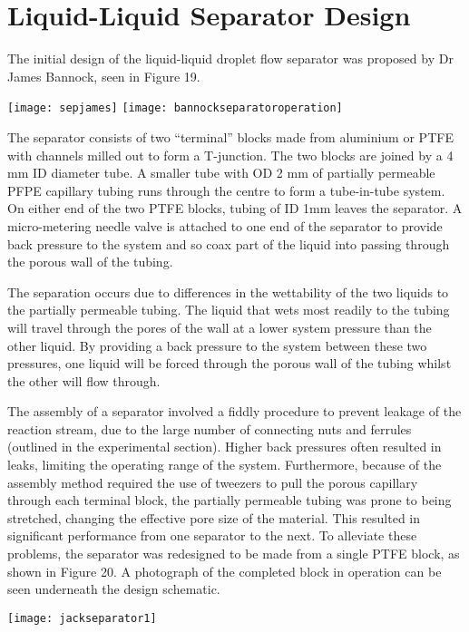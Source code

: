 \section{Liquid-Liquid Separator Design}

The initial design of the liquid-liquid droplet flow separator was proposed by Dr James Bannock, seen in Figure 19. 

\texttt{[image: sepjames]}
\texttt{[image: bannockseparatoroperation]}

The separator consists of two “terminal” blocks made from aluminium or PTFE with channels milled out to form a T-junction. The two blocks are joined by a 4 mm ID diameter tube. A smaller tube with OD 2 mm of partially permeable PFPE capillary tubing runs through the centre to form a tube-in-tube system. On either end of the two PTFE blocks, tubing of ID 1mm leaves the separator. A micro-metering needle valve is attached to one end of the separator to provide back pressure to the system and so coax part of the liquid into passing through the porous wall of the tubing.

The separation occurs due to differences in the wettability of the two liquids to the partially permeable tubing. The liquid that wets most readily to the tubing will travel through the pores of the wall at a lower system pressure than the other liquid. By providing a back pressure to the system between these two pressures, one liquid will be forced through the porous wall of the tubing whilst the other will flow through.

The assembly of a separator involved a fiddly procedure to prevent leakage of the reaction stream, due to the large number of connecting nuts and ferrules (outlined in the experimental section). Higher back pressures often resulted in leaks, limiting the operating range of the system. Furthermore, because of the assembly method required the use of tweezers to pull the porous capillary through each terminal block, the partially permeable tubing was prone to being stretched, changing the effective pore size of the material. This resulted in significant performance from one separator to the next. 
To alleviate these problems, the separator was redesigned to be made from a single PTFE block, as shown in Figure 20. A photograph of the completed block in operation can be seen underneath the design schematic.

\texttt{[image: jackseparator1]}

